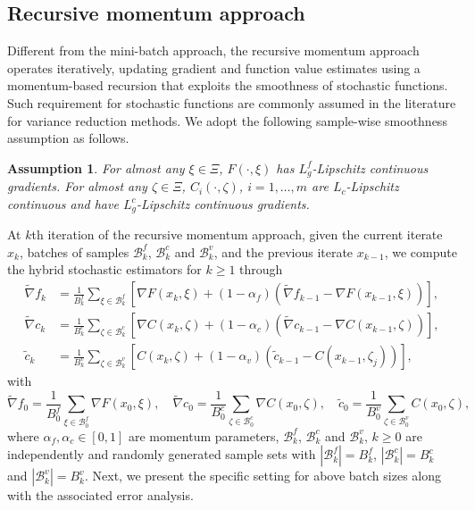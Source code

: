 \documentclass[11pt]{article}
\newtheorem{assumption}{Assumption}
\newcommand{\be}{\begin{equation}}
\newcommand{\ee}{\end{equation}}
\begin{document}
\subsection{Recursive momentum approach}\label{ssec:rm}

Different from the mini-batch approach, the recursive momentum approach operates iteratively, updating gradient and function value estimates using a momentum-based recursion that {exploits the smoothness of stochastic  functions. Such requirement} for  stochastic functions are commonly assumed in the literature for  variance reduction methods. We adopt the following sample-wise smoothness  assumption as follows.
\begin{assumption}\label{ass:ms}
For almost any $\xi\in \Xi$, $F(\cdot,\xi)$ has $L_g^f$-Lipschitz continuous gradients. For almost any  $\zeta\in \Xi$, $C_i(\cdot,\zeta)$, \(i = 1,\ldots,m\) are $L_c $-Lipschitz continuous and have  $L_g^c$-Lipschitz continuous gradients.
\end{assumption}

At $k$th iteration of the recursive momentum approach, given the current iterate \( x_k \), batches of samples \(\mathcal{B}_k^f\), \(\mathcal{B}_k^c\) and \(\mathcal{B}_k^v\), and the previous iterate \( x_{k-1} \), we compute the hybrid stochastic estimators for \(k \ge 1\) through
\be\label{gkf}
\begin{aligned}
    \tilde \nabla f_k &= \frac{1}{B_k^f} \sum_{\xi \in \mathcal B_k^f} \left[\nabla F(x_k,\xi) + (1-\alpha_f)\left(\tilde \nabla f_{k-1} - \nabla F(x_{k-1}, \xi)\right)\right], \\
    \tilde \nabla c_k &= \frac{1}{B_k^c} \sum_{\zeta \in \mathcal B_k^c} \left[\nabla C(x_k,\zeta) + (1-\alpha_c) \left(\tilde \nabla  c_{k-1} - \nabla C(x_{k-1},\zeta)\right)\right],\\
    \tilde c_k &= \frac{1}{B_k^v} \sum_{\zeta \in \mathcal B_k^v} \left[C(x_k,\zeta) + (1-\alpha_v) \left(\tilde c_{k-1} - C(x_{k-1},\zeta_j)\right)\right], 
\end{aligned}
\ee
with \[ \tilde \nabla f_0 = \frac{1}{B_0^f} \sum_{\xi \in \mathcal{B}_0^f} \nabla F(x_0, \xi), \quad \tilde \nabla c_0 = \frac{1}{B_0^c} \sum_{\zeta \in \mathcal{B}_0^c} \nabla C(x_0,\zeta), \quad \tilde c_0 = \frac{1}{B_0^v} \sum_{\zeta \in \mathcal{B}_0^v} C(x_0,\zeta),\] where \( \alpha_f, \alpha_c \in [0, 1] \) are momentum parameters, $\mathcal B_k^f$, $\mathcal B_k^c$ and $\mathcal B_k^v$, $k\ge0$ are independently and randomly generated sample sets with $|\mathcal B_k^f| = B_k^f$, $|\mathcal B_k^c| = B_k^c$ and $|\mathcal B_k^v| = B_k^v$. Next, we present the specific setting for above  batch sizes along with the associated error analysis.
\end{document}

